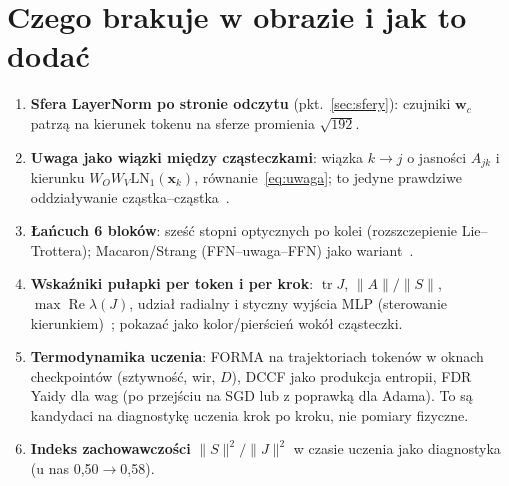 \documentclass[a4paper,11pt]{article}
\newcommand{\LN}{\mathrm{LN}}
\begin{document}
\section{Czego brakuje w obrazie i jak to dodać}
\begin{enumerate}
\item \textbf{Sfera LayerNorm po stronie odczytu} (pkt.~\ref{sec:sfery}): czujniki $\bm w_c$ patrzą na kierunek tokenu na sferze promienia $\sqrt{192}$.
\item \textbf{Uwaga jako wiązki między cząsteczkami}: wiązka $k\to j$ o jasności $A_{jk}$ i kierunku $W_OW_V\LN_1(\bm x_k)$, równanie~\eqref{eq:uwaga}; to jedyne prawdziwe oddziaływanie cząstka--cząstka~\cite{lu19,ges23}.
\item \textbf{Łańcuch 6 bloków}: sześć stopni optycznych po kolei (rozszczepienie Lie--Trottera); Macaron/Strang (FFN--uwaga--FFN) jako wariant~\cite{lu19}.
\item \textbf{Wskaźniki pułapki per token i per krok}: $\operatorname{tr}J$, $\lVert A\rVert/\lVert S\rVert$, $\max\operatorname{Re}\lambda(J)$, udział radialny i styczny wyjścia MLP (sterowanie kierunkiem)~\cite{mudarisov26}; pokazać jako kolor/pierścień wokół cząsteczki.
\item \textbf{Termodynamika uczenia}: FORMA na trajektoriach tokenów w oknach checkpointów (sztywność, wir, $D$), DCCF jako produkcja entropii, FDR Yaidy dla wag (po przejściu na SGD lub z poprawką dla Adama). To są kandydaci na diagnostykę uczenia krok po kroku, nie pomiary fizyczne.
\item \textbf{Indeks zachowawczości} $\lVert S\rVert^2/\lVert J\rVert^2$ w czasie uczenia jako diagnostyka (u nas 0{,}50$\to$0{,}58).
\end{enumerate}
\end{document}
